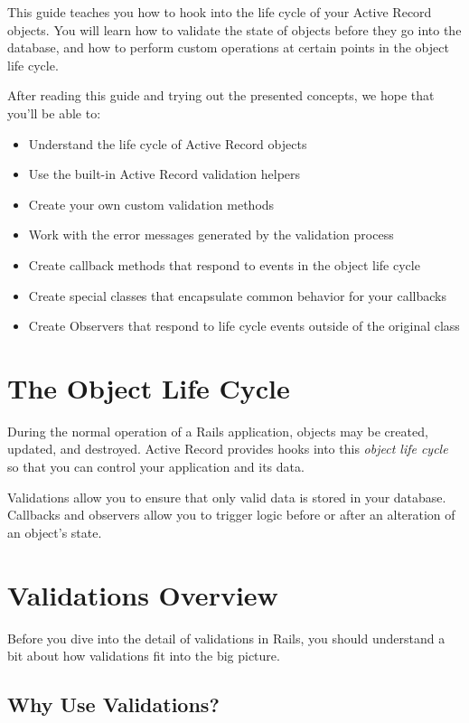 \documentclass[10pt]{book}
\begin{document}
This guide teaches you how to hook into the life cycle of your Active  Record objects. You will learn how to validate the state of objects  before they go into the database, and how to perform custom operations  at certain points in the object life cycle.

After reading this guide and trying out the presented concepts, we hope that you’ll be able to:
\begin{itemize}
	\item Understand the life cycle of Active Record objects
	\item Use the built-in Active Record validation helpers
	\item Create your own custom validation methods
	\item Work with the error messages generated by the validation process
	\item Create callback methods that respond to events in the object life cycle
	\item Create special classes that encapsulate common behavior for your callbacks
	\item Create Observers that respond to life cycle events outside of the original class
\end{itemize}

\section{ The Object Life Cycle}

During the normal operation of a Rails application, objects may be  created, updated, and destroyed. Active Record provides hooks into this \emph{object life cycle} so that you can control your application and its data.

Validations allow you to ensure that only valid data is stored in  your database. Callbacks and observers allow you to trigger logic before  or after an alteration of an object’s state.

\section{ Validations Overview}

Before you dive into the detail of validations in Rails, you should  understand a bit about how validations fit into the big picture.

\subsection{ Why Use Validations?}
\end{document}
